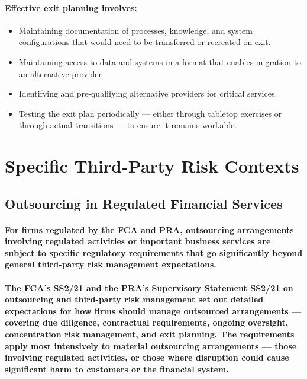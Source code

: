 \paragraph{Effective exit planning involves:}
\begin{itemize}
    \item{Maintaining documentation of processes, knowledge, and system configurations that would need to be transferred or recreated on exit.}
    \item{Maintaining access to data and systems in a format that enables migration to an alternative provider}
    \item{Identifying and pre-qualifying alternative providers for critical services.}
    \item{Testing the exit plan periodically — either through tabletop exercises or through actual transitions — to ensure it remains workable.}
\end{itemize}

\section{Specific Third-Party Risk Contexts}

\subsection{Outsourcing in Regulated Financial Services}
\paragraph{For firms regulated by the FCA and PRA, outsourcing arrangements involving regulated activities or important business services are subject to specific regulatory requirements that go significantly beyond general third-party risk management expectations.}
\paragraph{The \textbf{FCA's SS2/21} and the \textbf{PRA's Supervisory Statement SS2/21} on outsourcing and third-party risk management set out detailed expectations for how firms should manage outsourced arrangements — covering due diligence, contractual requirements, ongoing oversight, concentration risk management, and exit planning. The requirements apply most intensively to \textbf{material outsourcing} arrangements — those involving regulated activities, or those where disruption could cause significant harm to customers or the financial system.}

